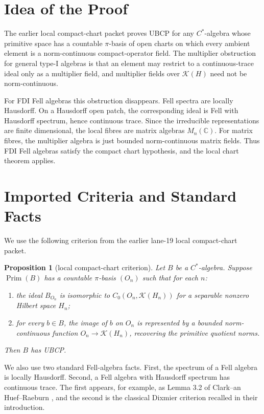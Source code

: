 \documentclass[11pt]{article}
\newtheorem{proposition}{Proposition}
\newcommand{\C}{\mathbb C}
\newcommand{\Kcal}{\mathcal K}
\newcommand{\Prim}{\operatorname{Prim}}
\begin{document}
\section*{Idea of the Proof}

The earlier local compact-chart packet proves UBCP for any \(C^*\)-algebra
whose primitive space has a countable \(\pi\)-basis of open charts on which
every ambient element is a norm-continuous compact-operator field.  The
multiplier obstruction for general type-I algebras is that an element may
restrict to a continuous-trace ideal only as a multiplier field, and multiplier
fields over \(\Kcal(H)\) need not be norm-continuous.

For FDI Fell algebras this obstruction disappears.  Fell spectra are locally
Hausdorff.  On a Hausdorff open patch, the corresponding ideal is Fell with
Hausdorff spectrum, hence continuous trace.  Since the irreducible
representations are finite dimensional, the local fibres are matrix algebras
\(M_n(\C)\).  For matrix fibres, the multiplier algebra is just bounded
norm-continuous matrix fields.  Thus FDI Fell algebras satisfy the compact
chart hypothesis, and the local chart theorem applies.

\section*{Imported Criteria and Standard Facts}

We use the following criterion from the earlier lane-19 local compact-chart
packet.

\begin{proposition}[local compact-chart criterion]
\label{prop:chart}
Let \(B\) be a \(C^*\)-algebra.  Suppose \(\Prim(B)\) has a countable
\(\pi\)-basis \((O_n)\) such that for each \(n\):
\begin{enumerate}
    \item the ideal \(B_{O_n}\) is isomorphic to
          \(C_0(O_n,\Kcal(H_n))\) for a separable nonzero Hilbert space
          \(H_n\);
    \item for every \(b\in B\), the image of \(b\) on \(O_n\) is represented
          by a bounded norm-continuous function
          \(O_n\to \Kcal(H_n)\), recovering the primitive quotient norms.
\end{enumerate}
Then \(B\) has UBCP.
\end{proposition}

We also use two standard Fell-algebra facts.  First, the spectrum of a Fell
algebra is locally Hausdorff.  Second, a Fell algebra with Hausdorff spectrum
has continuous trace.  The first appears, for example, as Lemma 3.2 of
Clark--an Huef--Raeburn \cite{CHR}, and the second is the classical
Dixmier criterion recalled in their introduction.
\end{document}
